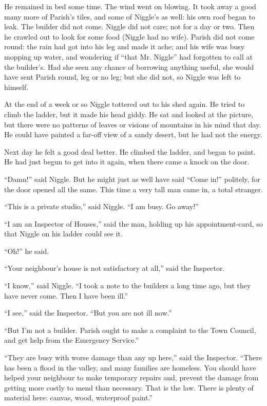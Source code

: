 \documentclass[english]{scrartcl}
\begin{document}
He remained in bed some time. The wind went on blowing. It took away a good many more of Parish’s tiles, and some of Niggle’s as well: his own roof began to leak. The builder did not come. Niggle did not care; not for a day or two. Then he crawled out to look for some food (Niggle had no wife). Parish did not come round: the rain had got into his leg and made it ache; and his wife was busy mopping up water, and wondering if “that Mr. Niggle” had forgotten to call at the builder’s. Had she seen any chance of borrowing anything useful, she would have sent Parish round, leg or no leg; but she did not, so Niggle was left to himself.

At the end of a week or so Niggle tottered out to his shed again. He tried to climb the ladder, but it made his head giddy. He sat and looked at the picture, but there were no patterns of leaves or visions of mountains in his mind that day. He could have painted a far-off view of a sandy desert, but he had not the energy.

Next day he felt a good deal better. He climbed the ladder, and began to paint. He had just begun to get into it again, when there came a knock on the door.

“Damn!” said Niggle. But he might just as well have said “Come in!” politely, for the door opened all the same. This time a very tall man came in, a total stranger.

“This is a private studio,” said Niggle. “I am busy. Go away!”

“I am an Inspector of Houses,” said the man, holding up his appointment-card, so that Niggle on his ladder could see it.

“Oh!” he said.

“Your neighbour’s house is not satisfactory at all,” said the Inspector.

“I know,” said Niggle. “I took a note to the builders a long time ago, but they have never come. Then I have been ill.”

“I see,” said the Inspector. “But you are not ill now.”

“But I’m not a builder. Parish ought to make a complaint to the Town Council, and get help from the Emergency Service.”

“They are busy with worse damage than any up here,” said the Inspector. “There has been a flood in the valley, and many families are homeless. You should have helped your neighbour to make temporary repairs and, prevent the damage from getting more costly to mend than necessary. That is the law. There is plenty of material here: canvas, wood, waterproof paint.”
\end{document}
